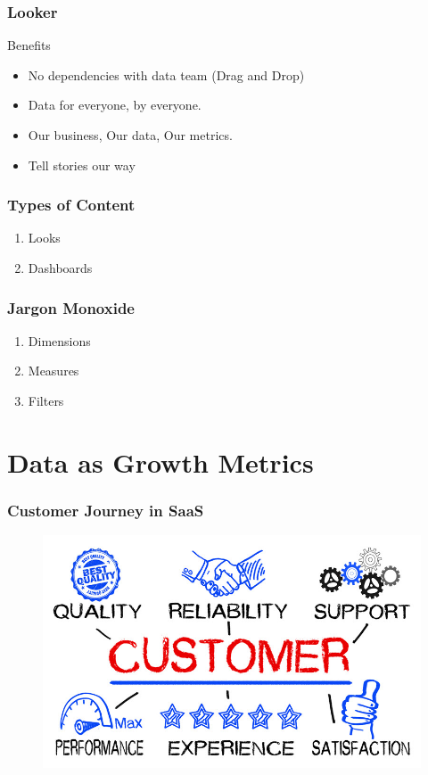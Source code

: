 \documentclass{beamer}
\begin{document}
\begin{frame}
\frametitle{Looker}
\large{Benefits}
\begin{itemize}
\item<1-> No dependencies with data team (Drag and Drop)
\item<2-> Data for everyone, by everyone.
\item<3-> Our business, Our data, Our metrics.
\item<4-> Tell stories our way
\end{itemize}
\end{frame}

\begin{frame}
\frametitle{Types  of Content}
\begin{enumerate}
\item Looks
\item Dashboards
\end{enumerate}
\end{frame}

\begin{frame}
\frametitle{Jargon Monoxide}
\begin{enumerate}
\item Dimensions
\item Measures
\item Filters

\end{enumerate}
\end{frame}

\section{Data as Growth Metrics}

\begin{frame}
\frametitle{Customer Journey in SaaS}
\begin{figure}
\includegraphics[width=0.8\linewidth]{Customer-Service.jpg}
\end{figure}
\end{frame}
\end{document}
